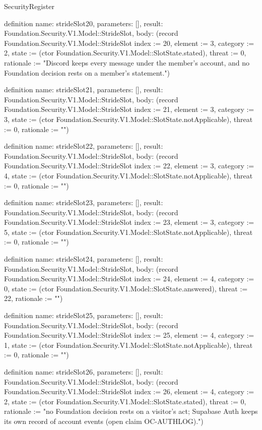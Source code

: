 \begin{lexlean}{SecurityRegister}
\begin{semanticmodule}
definition{
  name: strideSlot20,
  parameters: [],
  result: Foundation.Security.V1.Model::StrideSlot,
  body: (record Foundation.Security.V1.Model::StrideSlot {index := 20, element := 3, category := 2, state := (ctor Foundation.Security.V1.Model::SlotState.stated), threat := 0, rationale := "Discord keeps every message under the member's account, and no Foundation decision rests on a member's statement."})
}

definition{
  name: strideSlot21,
  parameters: [],
  result: Foundation.Security.V1.Model::StrideSlot,
  body: (record Foundation.Security.V1.Model::StrideSlot {index := 21, element := 3, category := 3, state := (ctor Foundation.Security.V1.Model::SlotState.notApplicable), threat := 0, rationale := ""})
}

definition{
  name: strideSlot22,
  parameters: [],
  result: Foundation.Security.V1.Model::StrideSlot,
  body: (record Foundation.Security.V1.Model::StrideSlot {index := 22, element := 3, category := 4, state := (ctor Foundation.Security.V1.Model::SlotState.notApplicable), threat := 0, rationale := ""})
}

definition{
  name: strideSlot23,
  parameters: [],
  result: Foundation.Security.V1.Model::StrideSlot,
  body: (record Foundation.Security.V1.Model::StrideSlot {index := 23, element := 3, category := 5, state := (ctor Foundation.Security.V1.Model::SlotState.notApplicable), threat := 0, rationale := ""})
}

definition{
  name: strideSlot24,
  parameters: [],
  result: Foundation.Security.V1.Model::StrideSlot,
  body: (record Foundation.Security.V1.Model::StrideSlot {index := 24, element := 4, category := 0, state := (ctor Foundation.Security.V1.Model::SlotState.answered), threat := 22, rationale := ""})
}

definition{
  name: strideSlot25,
  parameters: [],
  result: Foundation.Security.V1.Model::StrideSlot,
  body: (record Foundation.Security.V1.Model::StrideSlot {index := 25, element := 4, category := 1, state := (ctor Foundation.Security.V1.Model::SlotState.notApplicable), threat := 0, rationale := ""})
}

definition{
  name: strideSlot26,
  parameters: [],
  result: Foundation.Security.V1.Model::StrideSlot,
  body: (record Foundation.Security.V1.Model::StrideSlot {index := 26, element := 4, category := 2, state := (ctor Foundation.Security.V1.Model::SlotState.stated), threat := 0, rationale := "no Foundation decision rests on a visitor's act; Supabase Auth keeps its own record of account events (open claim OC-AUTHLOG)."})
}


\end{semanticmodule}
\end{lexlean}
